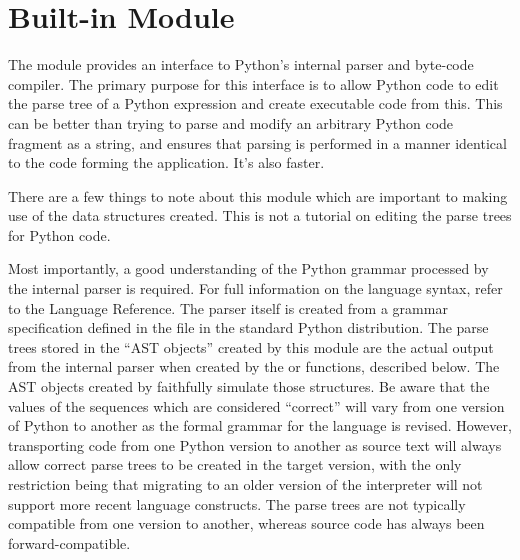 %
%
%

\section{Built-in Module }

The  module provides an interface to Python's internal
parser and byte-code compiler.  The primary purpose for this interface
is to allow Python code to edit the parse tree of a Python expression
and create executable code from this.  This can be better than trying
to parse and modify an arbitrary Python code fragment as a string, and
ensures that parsing is performed in a manner identical to the code
forming the application.  It's also faster.

There are a few things to note about this module which are important
to making use of the data structures created.  This is not a tutorial
on editing the parse trees for Python code.

Most importantly, a good understanding of the Python grammar processed
by the internal parser is required.  For full information on the
language syntax, refer to the Language Reference.  The parser itself
is created from a grammar specification defined in the file
 in the standard Python distribution.  The parse
trees stored in the ``AST objects'' created by this module are the
actual output from the internal parser when created by the
 or  functions, described below.  The AST
objects created by  faithfully simulate those
structures.  Be aware that the values of the sequences which are
considered ``correct'' will vary from one version of Python to another
as the formal grammar for the language is revised.  However,
transporting code from one Python version to another as source text
will always allow correct parse trees to be created in the target
version, with the only restriction being that migrating to an older
version of the interpreter will not support more recent language
constructs.  The parse trees are not typically compatible from one
version to another, whereas source code has always been
forward-compatible.

